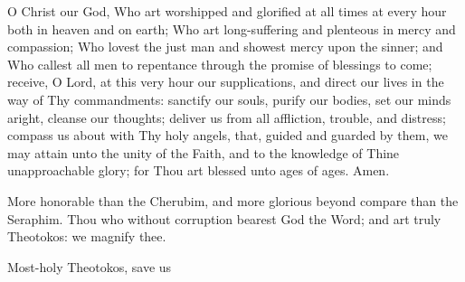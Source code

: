 \documentclass[twoside, letterpaper, 12pt]{report}
\begin{document}
\begin{reader}
  \item \lhmForty
  \item O Christ our God,
    Who art worshipped and glorified at all times at every hour both in heaven and on earth;
    Who art long-suffering and plenteous in mercy and compassion;
    Who lovest the just man and showest mercy upon the sinner;
    and Who callest all men to repentance through the promise of blessings to come;
    receive, O Lord, at this very hour our supplications,
    and direct our lives in the way of Thy commandments:
    sanctify our souls, purify our bodies, set our minds aright, cleanse our thoughts;
    deliver us from all affliction, trouble, and distress;
    compass us about with Thy holy angels, that, guided and guarded by them,
    we may attain unto the unity of the Faith,
    and to the knowledge of Thine unapproachable glory;
    for Thou art blessed unto ages of ages.
    Amen.
  \item \lhmThree
  \item \glory
  \item More honorable than the Cherubim,
    and more glorious beyond compare than the Seraphim.
    Thou who without corruption bearest God the Word;
    and art truly Theotokos: we magnify thee.
\end{reader}


\begin{reader}
  \item \lhmTwelve
  \item Most-holy Theotokos, save us
\end{reader}
\end{document}
